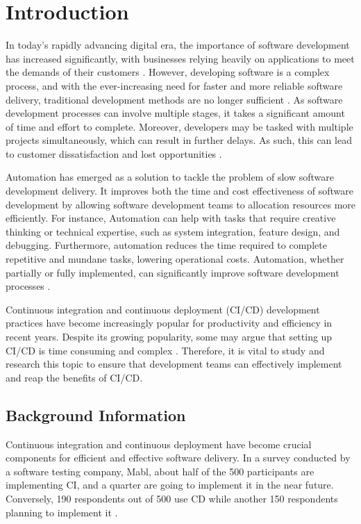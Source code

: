 \chapter{Introduction}

In today's rapidly advancing digital era, the importance of software development has increased significantly, with businesses relying heavily on applications to meet the demands of their customers \cite{hf}. However, developing software is a complex process, and with the ever-increasing need for faster and more reliable software delivery, traditional development methods are no longer sufficient \cite{dsmgm}. As software development processes can involve multiple stages, it takes a significant amount of time and effort to complete. Moreover, developers may be tasked with multiple projects simultaneously, which can result in further delays. As such, this can lead to customer dissatisfaction and lost opportunities \cite{sb}.

Automation has emerged as a solution to tackle the problem of slow software development delivery. It improves both the time and cost effectiveness of software development by allowing software development teams to allocation resources more efficiently. For instance, Automation can help with tasks that require creative thinking or technical expertise, such as system integration, feature design, and debugging. Furthermore, automation reduces the time required to complete repetitive and mundane tasks, lowering operational costs. Automation, whether partially or fully implemented, can significantly improve software development processes \cite{saarenpaa2020creating}.

Continuous integration and continuous deployment (CI/CD) development practices have become increasingly popular for productivity and efficiency in recent years. Despite its growing popularity, some may argue that setting up CI/CD is time consuming and complex \cite{sander}. Therefore, it is vital to study and research this topic to ensure that development teams can effectively implement and reap the benefits of CI/CD.

\section{Background Information}

Continuous integration and continuous deployment have become crucial components for efficient and effective software delivery. In a survey conducted by a software testing company, Mabl, about half of the 500 participants are implementing CI, and a quarter are going to implement it in the near future. Conversely, 190 respondents out of 500 use CD while another 150 respondents planning to implement it \cite{clark}. 

